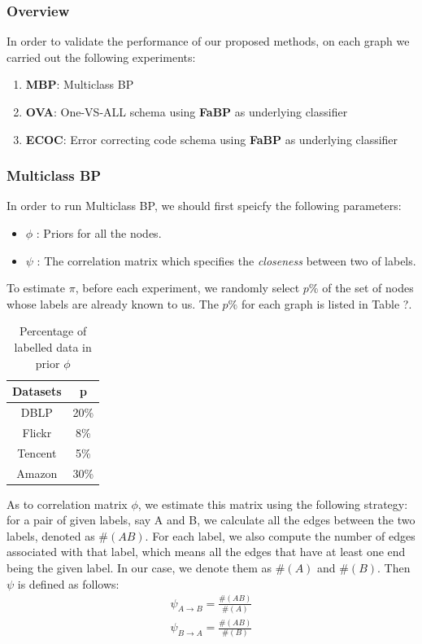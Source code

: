 \subsubsection*{Overview}
In order to validate the performance of our proposed methods, on each graph we carried out the following experiments:
\begin{enumerate}
	\item \textbf{MBP}: Multiclass BP
	\item \textbf{OVA}: One-VS-ALL schema using \textbf{FaBP} as underlying classifier
	\item \textbf{ECOC}: Error correcting code schema using \textbf{FaBP} as underlying classifier
\end{enumerate}

\subsubsection*{Multiclass BP}
In order to run Multiclass BP, we should first speicfy the following parameters:
\begin{itemize}
	\item \textbf{$\phi$} : Priors for all the nodes.
	\item \textbf{$\psi$} : The correlation matrix which specifies the \textit{closeness} between two of labels. 
\end{itemize}

To estimate $\pi$, before each experiment, we randomly select $p\%$ of the set of nodes whose labels are already known to us. The $p\%$ for each graph is listed in Table ?.

\begin{table}[!ht]
\centering
\begin{tabular}{c|c}
\toprule
\textbf{Datasets} & \textbf{p}\\
\midrule
DBLP & 20\%\\
Flickr & 8\%\\
Tencent & 5\%\\
Amazon & 30\%\\
\bottomrule
\end{tabular}
\caption{Percentage of labelled data in prior $\phi$}
\end{table} 

As to correlation matrix $\phi$, we estimate this matrix using the following strategy: for a pair of given labels, say A and B, we calculate all the edges between the two labels, denoted as $\#(AB)$. For each label, we also compute the number of edges associated with that label, which means all the edges that have at least one end being the given label. In our case, we denote them as $\#(A)$ and $\#(B)$. Then $\psi$ is defined as follows:
\begin{gather*}
	\psi_{A\rightarrow B} = \frac{\#(AB)}{\#(A)}\\
	\psi_{B\rightarrow A} = \frac{\#(AB)}{\#(B)}
\end{gather*}

